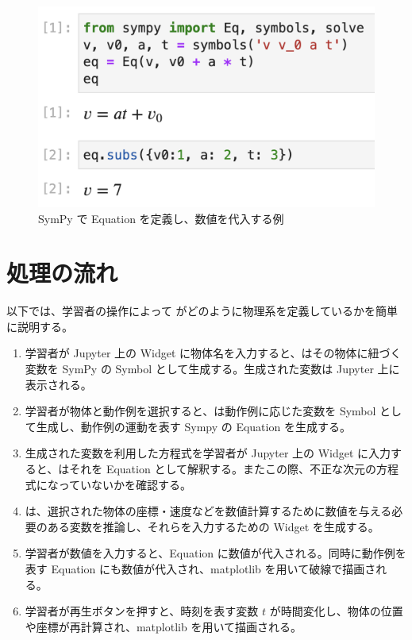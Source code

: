 \begin{figure}[bht]
\centering
\includegraphics[width=0.9\linewidth]{work/example_sympy.png}
\caption{SymPy で Equation を定義し、数値を代入する例} \label{example_sympy}
\end{figure}


\section{処理の流れ}
以下では、学習者の操作によって \simname がどのように物理系を定義しているかを簡単に説明する。

\begin{enumerate}
  \item 学習者が Jupyter 上の Widget に物体名を入力すると、\simname はその物体に紐づく変数を SymPy の Symbol として生成する。生成された変数は Jupyter 上に表示される。
  \item 学習者が物体と動作例を選択すると、\simname は動作例に応じた変数を Symbol として生成し、動作例の運動を表す Sympy の Equation を生成する。
  \item 生成された変数を利用した方程式を学習者が Jupyter 上の Widget に入力すると、\simname はそれを Equation として解釈する。またこの際、不正な次元の方程式になっていないかを確認する。 \label{未実装1}
  \item \simname は、選択された物体の座標・速度などを数値計算するために数値を与える必要のある変数を推論し、それらを入力するための Widget を生成する。 \label{未実装2}
  \item 学習者が数値を入力すると、Equation に数値が代入される。同時に動作例を表す Equation にも数値が代入され、matplotlib を用いて破線で描画される。
  \item 学習者が再生ボタンを押すと、時刻を表す変数 $t$ が時間変化し、物体の位置や座標が再計算され、matplotlib を用いて描画される。
\end{enumerate}

